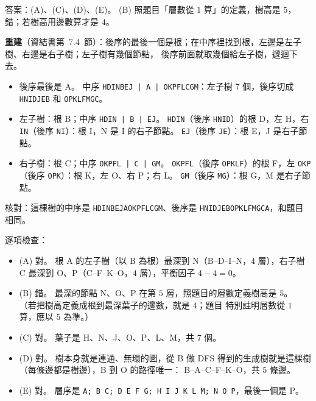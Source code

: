 \begin{pastsoln}
答案：(A)、(C)、(D)、(E)。 (B) 照題目「層數從 $1$ 算」的定義，樹高是 $5$，錯；若樹高用邊數算才是 $4$。

\textbf{重建}（資結書第~7.4~節）：後序的最後一個是根；在中序裡找到根，左邊是左子樹、右邊是右子樹；左子樹有幾個節點，
後序前面就取幾個給左子樹，遞迴下去。
\begin{itemize}
\item 後序最後是 A。 中序 \texttt{HDINBEJ | A | OKPFLCGM}：左子樹 $7$ 個，後序切成 \texttt{HNIDJEB} 和 \texttt{OPKLFMGC}。
\item 左子樹：根 B；中序 \texttt{HDIN | B | EJ}。 \texttt{HDIN}（後序 \texttt{HNID}）的根 D，左 H，右 \texttt{IN}（後序
\texttt{NI}）：根 I，N 是 I 的右子節點。 \texttt{EJ}（後序 \texttt{JE}）：根 E，J 是右子節點。
\item 右子樹：根 C；中序 \texttt{OKPFL | C | GM}。 \texttt{OKPFL}（後序 \texttt{OPKLF}）的根 F，左 \texttt{OKP}（後序
\texttt{OPK}）：根 K，左 O、右 P；右 L。 \texttt{GM}（後序 \texttt{MG}）：根 G，M 是右子節點。
\end{itemize}
\begin{center}
\end{center}
核對：這棵樹的中序是 \texttt{HDINBEJAOKPFLCGM}、後序是 \texttt{HNIDJEBOPKLFMGCA}，和題目相同。

逐項檢查：
\begin{itemize}
\item (A) 對。 根 A 的左子樹（以 B 為根）最深到 N（B--D--I--N，$4$ 層），右子樹 C 最深到 O、P（C--F--K--O，$4$ 層），平衡因子 $4 - 4 = 0$。
\item (B) 錯。 最深的節點 N、O、P 在第 $5$ 層，照題目的層數定義樹高是 $5$。 （若把樹高定義成根到最深葉子的邊數，就是 $4$；題目
特別註明層數從 $1$ 算，應以 $5$ 為準。）
\item (C) 對。 葉子是 H、N、J、O、P、L、M，共 $7$ 個。
\item (D) 對。 樹本身就是連通、無環的圖，從 B 做 DFS 得到的生成樹就是這棵樹（每條邊都是樹邊），B 到 O 的路徑唯一：
B--A--C--F--K--O，共 $5$ 條邊。
\item (E) 對。 層序是 \texttt{A; B C; D E F G; H I J K L M; N O P}，最後一個是 P。
\end{itemize}
\end{pastsoln}
